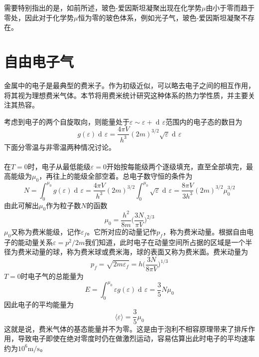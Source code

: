 \documentclass[UTF8,oneside,openany]{ctexbook}
\DeclareMathOperator\dif{d\!}
\newcommand\aver[1]{\langle#1\rangle}
\begin{document}
需要特别指出的是，如前所述，玻色-爱因斯坦凝聚出现在化学势$\mu$由小于零而趋于零处，因此对于化学势$\mu$恒为零的玻色体系，例如光子气，玻色-爱因斯坦凝聚不存在。
\clearpage
\section{自由电子气}\label{jinshu}
金属中的电子是最典型的费米子。作为初级近似，可以略去电子之间的相互作用，将其视为理想费米气体。本节将用费米统计研究这种体系的热力学性质，并主要关注其热容。

考虑到电子的两个自旋取向，则能量处于$\varepsilon\sim\varepsilon+\dif\varepsilon$范围内的电子态的数目为
\begin{equation}
g(\varepsilon)\dif\varepsilon=\frac{4\pi V}{h^3}(2m)^{3/2}\sqrt{\varepsilon}\dif\varepsilon
\end{equation}
下面分零温与非零温两种情况讨论。
\\
\\
在$T=0$时，电子从最低能级$\varepsilon=0$开始按每能级两个逐级填充，直至全部填完，最高能级为$\mu_0$，再往上的能级全部空着。总电子数守恒的条件为
\begin{equation}
N=\int_{0}^{\mu_0}g(\varepsilon)\dif\varepsilon=\frac{4\pi V}{h^3}(2m)^{3/2}\int_{0}^{\mu_0}\sqrt{\varepsilon}\dif\varepsilon=\frac{8\pi V}{3h^3}(2m)^{3/2}\mu_0^{3/2}
\end{equation}
由此可解出$\mu_0$作为粒子数$N$的函数
\begin{equation}
\mu_0=\frac{h^2}{8m}\biggl(\frac{3N}{\pi V}\biggr)^{2/3}
\end{equation}
$\mu_0$又称为费米能级，记作$\varepsilon_f$。它所对应的动量记作$p_f$，称为费米动量。根据自由电子的能动量关系$\varepsilon=p^2/2m$我们知道，此时电子在动量空间所占据的区域是一个半径为费米动量的球，称为费米球或费米海，球的表面又称为费米面。费米动量为
\begin{equation}
p_f=\sqrt{2m\varepsilon_f}=h\biggl(\frac{3N}{8\pi V}\biggr)^{1/3}
\end{equation}
$T=0$时电子气的总能量为
\begin{equation}
E=\int_{0}^{\mu_0}\varepsilon g(\varepsilon)\dif\varepsilon=\frac35N\mu_0
\end{equation}
因此电子的平均能量为
\begin{equation}
\aver{\varepsilon}=\frac35\mu_0
\end{equation}
这就是说，费米气体的基态能量并不为零。这是由于泡利不相容原理带来了排斥作用，导致电子即使在绝对零度时仍在做激烈运动，容易估算出此时电子的平均速率约为$10^6\text{m/s}$。
\end{document}
